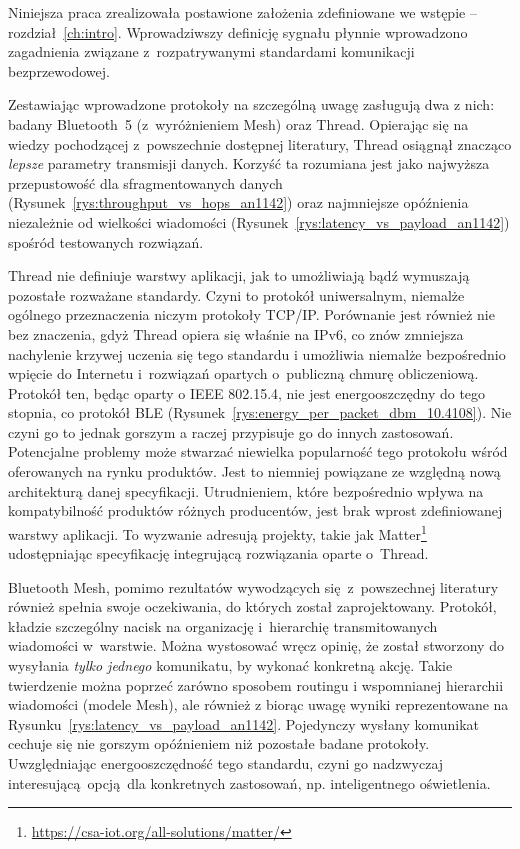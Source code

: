 Niniejsza praca zrealizowała postawione założenia zdefiniowane we wstępie -- rozdział~\ref{ch:intro}.
Wprowadziwszy definicję sygnału płynnie wprowadzono zagadnienia związane z~rozpatrywanymi
standardami komunikacji bezprzewodowej.

Zestawiając wprowadzone protokoły na szczególną uwagę zasługują dwa z nich: badany Bluetooth~5
(z~wyróżnieniem Mesh) oraz Thread. Opierając się na wiedzy pochodzącej z~powszechnie
dostępnej literatury, Thread osiągnął znacząco \textit{lepsze} parametry transmisji danych.
Korzyść ta rozumiana jest jako najwyższa przepustowość dla sfragmentowanych danych (Rysunek~\ref{rys:throughput_vs_hops_an1142})
oraz najmniejsze opóźnienia niezależnie od wielkości wiadomości (Rysunek~\ref{rys:latency_vs_payload_an1142}) spośród
testowanych rozwiązań.

Thread nie definiuje warstwy aplikacji, jak to umożliwiają bądź wymuszają pozostałe rozważane standardy.
Czyni to protokół uniwersalnym, niemalże ogólnego przeznaczenia niczym protokoły TCP/IP. Porównanie jest
również nie bez znaczenia, gdyż Thread opiera się właśnie na IPv6, co znów zmniejsza nachylenie
krzywej uczenia się tego standardu i umożliwia niemalże bezpośrednio wpięcie do Internetu i~rozwiązań opartych
o~publiczną chmurę obliczeniową. Protokół ten, będąc oparty o IEEE 802.15.4, nie jest energooszczędny
do tego stopnia, co protokół BLE (Rysunek~\ref{rys:energy_per_packet_dbm_10.4108}). 
Nie czyni go to jednak gorszym a raczej przypisuje go do innych
zastosowań. Potencjalne problemy może stwarzać niewielka popularność tego protokołu wśród oferowanych
na rynku produktów. Jest to niemniej powiązane ze względną nową architekturą danej specyfikacji.
Utrudnieniem, które bezpośrednio wpływa na kompatybilność produktów różnych producentów, jest brak
wprost zdefiniowanej warstwy aplikacji. To wyzwanie adresują projekty, takie jak 
Matter\footnote{\url{https://csa-iot.org/all-solutions/matter/}}
udostępniając specyfikację integrującą rozwiązania oparte o~Thread.

Bluetooth Mesh, pomimo rezultatów wywodzących się z~powszechnej literatury również spełnia swoje
oczekiwania, do których został zaprojektowany. Protokół, kładzie szczególny nacisk na organizację
i~hierarchię transmitowanych wiadomości w~warstwie. Można wystosować wręcz opinię, że został stworzony
do wysyłania \textit{tylko jednego} komunikatu, by wykonać konkretną akcję. Takie twierdzenie można
poprzeć zarówno sposobem routingu i wspomnianej hierarchii wiadomości (modele Mesh), ale również
z biorąc uwagę wyniki reprezentowane na Rysunku~\ref{rys:latency_vs_payload_an1142}. Pojedynczy wysłany
komunikat cechuje się nie gorszym opóźnieniem niż pozostałe badane protokoły. Uwzględniając energooszczędność
tego standardu, czyni go nadzwyczaj interesującą opcją dla konkretnych zastosowań, np. inteligentnego
oświetlenia.


